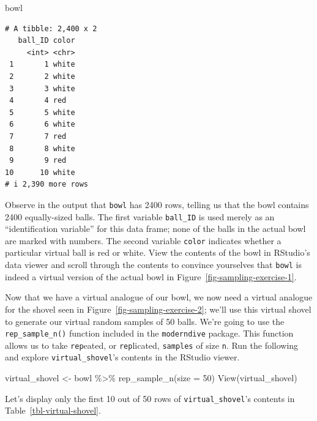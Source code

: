 \documentclass[
  letterpaper,
  DIV=11,
  numbers=noendperiod]{scrreprt}
\newenvironment{Shaded}{\begin{snugshade}}{\end{snugshade}}
\newcommand{\AttributeTok}[1]{\textcolor[rgb]{0.40,0.45,0.13}{#1}}
\newcommand{\DecValTok}[1]{\textcolor[rgb]{0.68,0.00,0.00}{#1}}
\newcommand{\FunctionTok}[1]{\textcolor[rgb]{0.28,0.35,0.67}{#1}}
\newcommand{\NormalTok}[1]{\textcolor[rgb]{0.00,0.23,0.31}{#1}}
\newcommand{\OtherTok}[1]{\textcolor[rgb]{0.00,0.23,0.31}{#1}}
\newcommand{\SpecialCharTok}[1]{\textcolor[rgb]{0.37,0.37,0.37}{#1}}
\theoremstyle{definition}
\theoremstyle{remark}
\begin{document}
\begin{Shaded}
\begin{Highlighting}[]
\NormalTok{bowl}
\end{Highlighting}
\end{Shaded}

\begin{verbatim}
# A tibble: 2,400 x 2
   ball_ID color
     <int> <chr>
 1       1 white
 2       2 white
 3       3 white
 4       4 red  
 5       5 white
 6       6 white
 7       7 red  
 8       8 white
 9       9 red  
10      10 white
# i 2,390 more rows
\end{verbatim}

Observe in the output that \texttt{bowl} has 2400 rows, telling us that
the bowl contains 2400 equally-sized balls. The first variable
\texttt{ball\_ID} is used merely as an ``identification variable'' for
this data frame; none of the balls in the actual bowl are marked with
numbers. The second variable \texttt{color} indicates whether a
particular virtual ball is red or white. View the contents of the bowl
in RStudio's data viewer and scroll through the contents to convince
yourselves that \texttt{bowl} is indeed a virtual version of the actual
bowl in Figure~\ref{fig-sampling-exercise-1}.

Now that we have a virtual analogue of our bowl, we now need a virtual
analogue for the shovel seen in Figure~\ref{fig-sampling-exercise-2};
we'll use this virtual shovel to generate our virtual random samples of
50 balls. We're going to use the \texttt{rep\_sample\_n()} function
included in the \texttt{moderndive} package. This function allows us to
take \texttt{rep}eated, or \texttt{rep}licated, \texttt{samples} of size
\texttt{n}. Run the following and explore \texttt{virtual\_shovel}'s
contents in the RStudio viewer.

\begin{Shaded}
\begin{Highlighting}[]
\NormalTok{virtual\_shovel }\OtherTok{\textless{}{-}}\NormalTok{ bowl }\SpecialCharTok{\%\textgreater{}\%} 
  \FunctionTok{rep\_sample\_n}\NormalTok{(}\AttributeTok{size =} \DecValTok{50}\NormalTok{)}
\FunctionTok{View}\NormalTok{(virtual\_shovel)}
\end{Highlighting}
\end{Shaded}

Let's display only the first 10 out of 50 rows of
\texttt{virtual\_shovel}'s contents in Table~\ref{tbl-virtual-shovel}.
\end{document}

